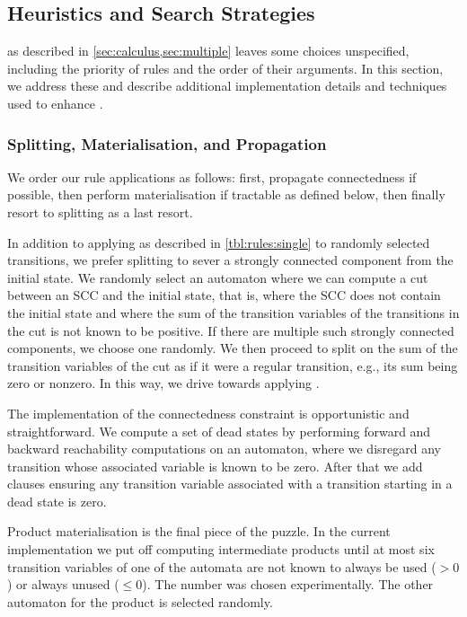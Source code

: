 
\subsection{Heuristics and Search Strategies}

\Calculus{} as described in \cref{sec:calculus,sec:multiple} leaves some choices
unspecified, including the priority of rules and the order of their arguments. In
this section, we address these and describe additional implementation details
and techniques used to enhance \Catra{}.

\subsubsection{Splitting, Materialisation, and Propagation}

We order our rule applications as follows: first, propagate connectedness if
possible, then perform materialisation if tractable as defined below, then
finally resort to splitting as a last resort.

In addition to applying \Split{} as described in \cref{tbl:rules:single} to
randomly selected transitions, we prefer splitting to sever a strongly connected
component from the initial state. We randomly select an automaton where we can
compute a cut between an SCC and the initial state, that is, where the SCC does
not contain the initial state and where the sum of the transition variables of
the transitions in the cut is not known to be positive. If there are multiple
such strongly connected components, we choose one randomly. We then proceed to
split on the sum of the transition variables of the cut as if it were a regular
transition, e.g., its sum being zero or nonzero. In this way, we drive \Calculus{}
towards applying \Propagate{}.

The implementation of the connectedness constraint is opportunistic and
straightforward. We compute a set of dead states by performing forward and
backward reachability computations on an automaton, where we disregard any
transition whose associated variable is known to be zero. After that we add
clauses ensuring any transition variable associated with a transition starting
in a dead state is zero.

Product materialisation is the final piece of the puzzle. In the current
implementation we put off computing intermediate products until at most six transition
variables of one of the automata are not known to always be used ($> 0$) or always unused ($\leq 0$). The
number was chosen experimentally. The other automaton for the product is
selected randomly.

